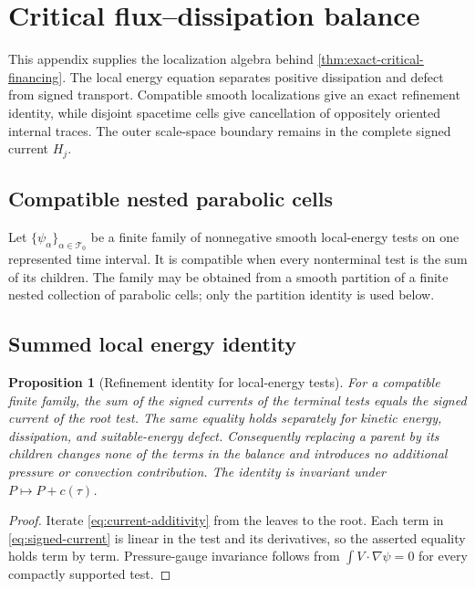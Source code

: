 \documentclass[11pt]{amsart}
\numberwithin{equation}{section}
\theoremstyle{plain}
\newtheorem{proposition}[proposition]{Proposition}
\theoremstyle{definition}
\theoremstyle{remark}
\begin{document}
\section{Critical flux--dissipation balance}
\label{app:scale-space-current}

This appendix supplies the localization algebra behind
\cref{thm:exact-critical-financing}.  The local energy equation separates
positive dissipation and defect from signed transport.  Compatible smooth
localizations give an exact refinement identity, while disjoint spacetime
cells give cancellation of oppositely oriented internal traces.  The outer
scale-space boundary remains in the complete signed current \(H_j\).

\subsection{Compatible nested parabolic cells}
\label{app:nested-parabolic-cells}

Let \(\{\psi_\alpha\}_{\alpha\in\mathcal T_0}\) be a finite family of
nonnegative smooth local-energy tests on one represented time interval.  It
is compatible when every nonterminal test is the sum of its children.  The
family may be obtained from a smooth partition of a finite nested collection
of parabolic cells; only the partition identity is used below.

\subsection{Summed local energy identity}
\label{app:summed-local-energy}

\begin{proposition}[Refinement identity for local-energy tests]
\label{prop:finite-scale-space-cancellation}
For a compatible finite family, the sum of the signed currents of the
terminal tests equals the signed current of the root test.  The same equality
holds separately for kinetic energy, dissipation, and suitable-energy defect.
Consequently replacing a parent by its children changes none of the terms in
the balance and introduces no additional pressure or convection contribution.
The identity is invariant under \(P\mapsto P+c(\tau)\).
\end{proposition}

\begin{proof}
Iterate \eqref{eq:current-additivity} from the leaves to the root.  Each term
in \eqref{eq:signed-current} is linear in the test and its derivatives, so
the asserted equality holds term by term.  Pressure-gauge invariance follows
from \(\int V\cdot\nabla\psi=0\) for every compactly supported test.
\end{proof}
\end{document}
